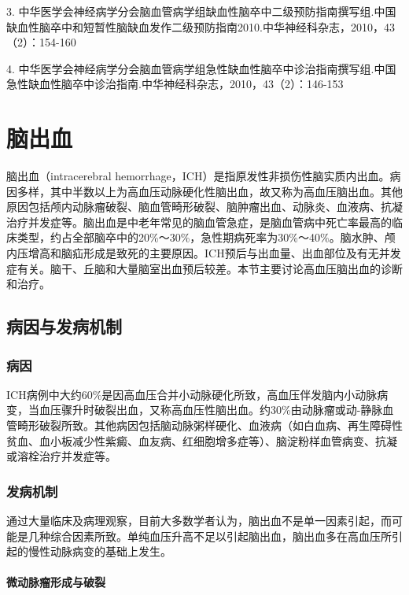 3.
中华医学会神经病学分会脑血管病学组缺血性脑卒中二级预防指南撰写组.中国缺血性脑卒中和短暂性脑缺血发作二级预防指南2010.中华神经科杂志，2010，43（2）：154-160

4.
中华医学会神经病学分会脑血管病学组急性缺血性脑卒中诊治指南撰写组.中国急性缺血性脑卒中诊治指南.中华神经科杂志，2010，43（2）：146-153

\protect\hypertarget{text00243.html}{}{}

\section{脑出血}

脑出血（intracerebral
hemorrhage，ICH）是指原发性非损伤性脑实质内出血。病因多样，其中半数以上为高血压动脉硬化性脑出血，故又称为高血压脑出血。其他原因包括颅内动脉瘤破裂、脑血管畸形破裂、脑肿瘤出血、动脉炎、血液病、抗凝治疗并发症等。脑出血是中老年常见的脑血管急症，是脑血管病中死亡率最高的临床类型，约占全部脑卒中的20\%～30\%，急性期病死率为30\%～40\%。脑水肿、颅内压增高和脑疝形成是致死的主要原因。ICH预后与出血量、出血部位及有无并发症有关。脑干、丘脑和大量脑室出血预后较差。本节主要讨论高血压脑出血的诊断和治疗。

\subsection{病因与发病机制}

\subsubsection{病因}

ICH病例中大约60\%是因高血压合并小动脉硬化所致，高血压伴发脑内小动脉病变，当血压骤升时破裂出血，又称高血压性脑出血。约30\%由动脉瘤或动-静脉血管畸形破裂所致。其他病因包括脑动脉粥样硬化、血液病（如白血病、再生障碍性贫血、血小板减少性紫癜、血友病、红细胞增多症等）、脑淀粉样血管病变、抗凝或溶栓治疗并发症等。

\subsubsection{发病机制}

通过大量临床及病理观察，目前大多数学者认为，脑出血不是单一因素引起，而可能是几种综合因素所致。单纯血压升高不足以引起脑出血，脑出血多在高血压所引起的慢性动脉病变的基础上发生。

\paragraph{微动脉瘤形成与破裂}

